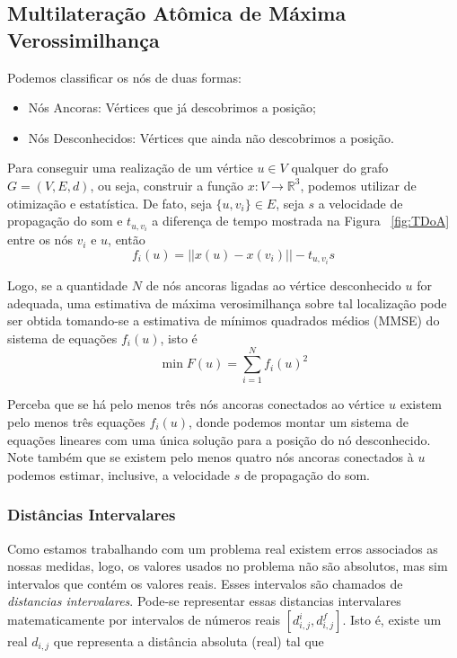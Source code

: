 \documentclass[11pt]{article}
\begin{document}
{\subsection{Multilateração Atômica de Máxima Verossimilhança}
Podemos classificar os nós de duas formas: 
\begin{itemize}
	\item Nós Ancoras: Vértices que já descobrimos a posição;
	\item Nós Desconhecidos: Vértices que ainda não descobrimos a posição.
\end{itemize}

Para conseguir uma realização de um vértice $u \in V$ qualquer do grafo $G = (V, E, d)$, ou seja, construir a função $x: V \rightarrow \mathbb{R}^3$, podemos utilizar de otimização e estatística. De fato, seja $\{u,v_i\} \in E$, seja $s$ a velocidade de propagação do som e $t_{u,v_i}$ a diferença de tempo mostrada na Figura ~\ref{fig:TDoA} entre os nós $v_i$ e $u$, então
$$f_i(u) = ||x(u) - x(v_i)|| - t_{u,v_i} s$$

Logo, se a quantidade $N$ de nós ancoras ligadas ao vértice desconhecido $u$ for adequada, uma estimativa de máxima verosimilhança sobre tal localização pode ser obtida tomando-se a estimativa de mínimos quadrados médios (MMSE) do sistema de equações $f_i(u)$, isto é
$$\min F(u) = \sum_{i = 1}^{N}{f_i(u)^2}$$

Perceba que se há pelo menos três nós ancoras conectados ao vértice $u$ existem pelo menos três equações $f_i(u)$, donde podemos montar um sistema de equações lineares com uma única solução para a posição do nó desconhecido. Note também que se existem pelo menos quatro nós ancoras conectados à $u$ podemos estimar, inclusive, a velocidade $s$ de propagação do som. \cite{savvides2001dynamic}

\subsubsection{Distâncias Intervalares}

Como estamos trabalhando com um problema real existem erros associados as nossas medidas, logo, os valores usados no problema não são absolutos, mas sim intervalos que contém os valores reais. Esses intervalos são chamados de \textit{distancias intervalares}. Pode-se representar essas distancias intervalares matematicamente por intervalos de números reais $[d_{i,j}^i, d_{i,j}^f]$. Isto é, existe um real $d_{i,j}$ que representa a distância absoluta (real) tal que

}
\end{document}
